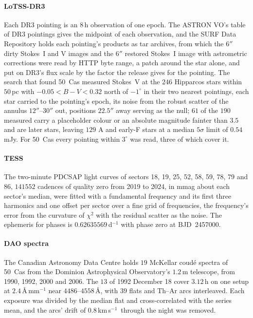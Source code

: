 \documentclass[3p,11pt]{elsarticle}
\newcommand{\kms}{km\,s$^{-1}$}
\begin{document}
\paragraph{LoTSS-DR3} Each DR3 pointing is an $8$\,h observation of one epoch. The
ASTRON VO's table of DR3 pointings gives the midpoint of each observation, and the SURF
Data Repository holds each pointing's products as tar archives, from which the $6''$
dirty Stokes~I and V images and the $6''$ restored Stokes~I image with astrometric
corrections were read by HTTP byte range, a patch around the star alone, and put on
DR3's flux scale by the factor the release gives for the pointing. The search that found
50~Cas measured Stokes~V at the $246$ Hipparcos stars within $50$\,pc with
$-0.05<B-V<0.32$ north of $-1^\circ$ in their two nearest pointings, each star carried to
the pointing's epoch, its noise from the robust scatter of the annulus $12''$--$30''$
out, positions $22.5''$ away serving as the null; $61$ of the $190$ measured carry a
placeholder colour or an absolute magnitude fainter than $3.5$ and are later stars,
leaving $129$ A and early-F stars at a median $5\sigma$ limit of $0.54$\,mJy. For 50~Cas
every pointing within $3^\circ$ was read, three of which cover it.

\paragraph{TESS} The two-minute PDCSAP light curves of sectors 18, 19, 25, 52, 58, 59,
78, 79 and 86, $141552$ cadences of quality zero from 2019 to 2024, in mmag about each
sector's median, were fitted with a fundamental frequency and its first three harmonics
and one offset per sector over a fine grid of frequencies, the frequency's error from
the curvature of $\chi^2$ with the residual scatter as the noise. The ephemeris for
phases is $0.62635569$\,d$^{-1}$ with phase zero at BJD~2457000.

\paragraph{DAO spectra} The Canadian Astronomy Data Centre holds $19$ McKellar coud\'e
spectra of 50~Cas from the Dominion Astrophysical Observatory's $1.2$\,m telescope, from
1990, 1992, 2000 and 2006. The $13$ of 1992 December 18 cover $3.12$\,h on one setup at
$2.4$\,\AA\,mm$^{-1}$ near $4486$--$4558$\,\AA, with $39$ flats and Th--Ar arcs
interleaved. Each exposure was divided by the median flat and cross-correlated with the
series mean, and the arcs' drift of $0.8$\,\kms\ through the night was removed.
\end{document}
